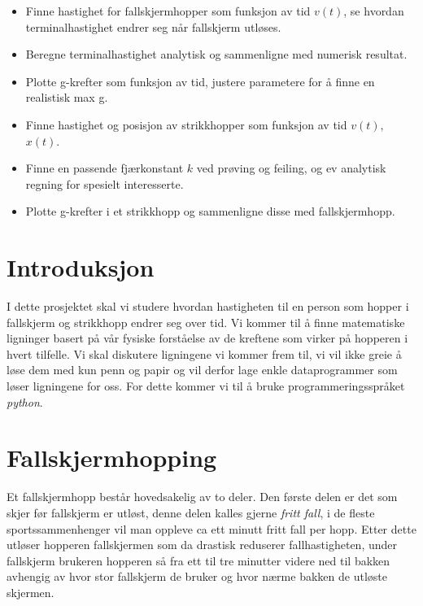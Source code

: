 \documentclass[a4paper, 11pt, notitlepage, english]{article}
\begin{document}
\begin{itemize}
 \item Finne hastighet for fallskjermhopper som funksjon av tid $v(t)$, se hvordan terminalhastighet endrer seg når fallskjerm utløses.
 \item Beregne terminalhastighet analytisk og sammenligne med numerisk resultat.
 \item Plotte g-krefter som funksjon av tid, justere parametere for å finne en realistisk max g.
 \item Finne hastighet og posisjon av strikkhopper som funksjon av tid $v(t)$, $x(t)$.
 \item Finne en passende fjærkonstant $k$ ved prøving og feiling, og ev analytisk regning for spesielt interesserte.
 \item Plotte g-krefter i et strikkhopp og sammenligne disse med fallskjermhopp.
\end{itemize}


\clearpage

\section{Introduksjon}

I dette prosjektet skal vi studere hvordan hastigheten til en person som hopper i fallskjerm og strikkhopp endrer seg over tid. Vi kommer til å finne matematiske ligninger basert på vår fysiske forståelse av de kreftene som virker på hopperen i hvert tilfelle. Vi skal diskutere ligningene vi kommer frem til, vi vil ikke greie å løse dem med kun penn og papir og vil derfor lage enkle dataprogrammer som løser ligningene for oss. For dette kommer vi til å bruke programmeringsspråket \emph{python}.


\section{Fallskjermhopping}

Et fallskjermhopp består hovedsakelig av to deler. Den første delen er det som skjer før fallskjerm er utløst, denne delen kalles gjerne \emph{fritt fall}, i de fleste sportssammenhenger vil man oppleve ca ett minutt fritt fall per hopp. Etter dette utløser hopperen fallskjermen som da drastisk reduserer fallhastigheten, under fallskjerm brukeren hopperen så fra ett til tre minutter videre ned til bakken avhengig av hvor stor fallskjerm de bruker og hvor nærme bakken de utløste skjermen.
\end{document}
